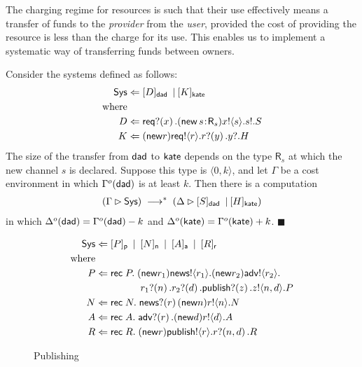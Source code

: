 \documentclass{LMCS}
\newcommand{\pfn}[1]{\mathsf{#1}}  \newcommand{\cfn}[1]{\mathsf{#1}}  \newcommand{\ownfnt}[1]{{\mathsf{#1}}}
\newcommand{\with}{\mathbin \rhd}
\def\pair(#1,#2){\langle #1 , #2 \rangle}\newcommand{\parrow}{ \mathbin{\rightharpoonup}}
\newcommand{\typeletter}[1]{{\mathsf{#1}}}
\newcommand{\tR}{\typeletter{R}}
\newcommand{\pa}[1]{\!\left(#1\right)}
\newcommand{\pc}[1]{\langle#1\rangle}
\newcommand{\Cassoc}[2]{ {{#1}\kern -0.2em : \kern -0.2em {#2}}}
\newcommand{\Cnew}[2]{(\mathop{\pfn{new}} \Cassoc{#1}{#2})}
\newcommand{\CnewNT}[1]{(\pfn{new} {#1})}
\newcommand{\Cpar}{\mathbin{|}}
\newcommand{\Crec}[2]{\pfn{rec}\;#1.\;#2}
\newcommand{\Cloc}[2]{[#1]_{\ownfnt{#2}}}
\newcommand{\smalleval}{\longrightarrow}  \newcommand{\csmalleval}[1]{\longrightarrow^{#1}}
\newcommand{\EndDefBox}{\null\hfill$\blacksquare$}
\newcommand{\boxHere}{\global\let\EndProof\empty\EndDefBox}
\begin{document}
The charging regime for resources is such that their use effectively
means a transfer of funds to the \emph{provider} from the \emph{user},
provided the cost of providing the resource is less than the charge
for its use. This enables us to implement a systematic way of
transferring funds between owners.
\begin{exa}\label{ex:fund.transfer} 
Consider the systems defined as follows:
  \begin{align*}
    \Sys &\Leftarrow  \Cloc{D}{\dad} \;\Cpar \Cloc{K}{\kate}\\
\text{where}\\
D        &\Leftarrow \Creq?\pa{x}. \Cnew{s}{\tR_s} x!\pc{s}. s!.S\\
K        &\Leftarrow \CnewNT{r} \Creq!\pc{r}.r?\pa{y}. y?.H
  \end{align*}
The size of the transfer from $\dad$ to $\kate$ depends on the type $\tR_s$ at which the
new channel $s$ is declared. Suppose this type is $\pair(0,k)$, and let $\Gamma$ be a cost environment
in which $\Gamma^o(\dad)$ is at least $k$.  Then there is a computation
\begin{align*}
  (\Gamma \with \Sys) \;\smalleval^*\; (\Delta \with \Cloc{S}{\dad} \;\Cpar \Cloc{H}{\kate})
\end{align*}
in which $\Delta^o(\dad) = \Gamma^o(\dad) - k$ and $\Delta^o(\kate) = \Gamma^o(\kate)+k$.
\boxHere
\end{exa}
\begin{figure}[t]


  \begin{align*}
\Sys       &\Leftarrow \Cloc{P}{p} \;\Cpar\; 
                        \Cloc{N}{n} \;\Cpar\;  \Cloc{A}{a} \;\Cpar\; \Cloc{R}{r}\\
\text{where} \\
P          &\Leftarrow \Crec{P}{\CnewNT{r_1} \news!\pc{r_1}. \CnewNT{r_2} \adv!\pc{r_2}. \\
           &\phantom{\Leftarrow  \CnewNT{r_1} }  r_1?\pa{n}. r_2?\pa{d}. \publish?\pa{z}. z!\pc{n,d}. P  }
\\
N         &\Leftarrow \Crec{N}{\news?\pa{r} \CnewNT{n} r!\pc{n}.N}
\\
A         &\Leftarrow \Crec{A} {\adv?\pa{r}. \CnewNT{d} r!\pc{d}.A}
\\
R         &\Leftarrow \Crec{R}{\CnewNT{r} \publish!\pc{r}. r?\pa{n,d}.R}
\end{align*}
  \caption{Publishing}
  \label{fig:publish}
\end{figure}
\end{document}
